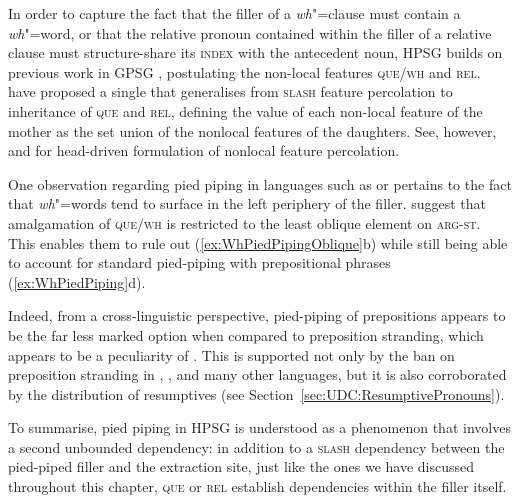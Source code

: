\documentclass[output=paper
,notxmath 
	        ,collection
	        ,collectionchapter
 	        ,biblatex
                ,babelshorthands
                ,newtxmath
                ,draftmode
                ,colorlinks, citecolor=brown
]{langscibook}
\begin{document}
\noindent
In order to capture the fact that the filler of a \emph{wh}"=clause
must contain a \emph{wh}"=word, or that the relative pronoun contained
within the filler of a relative clause must structure-share its
\textsc{index} with the antecedent noun, HPSG builds on previous work
in GPSG \citep{Gazdar85}\addpages, postulating the non-local features
\textsc{que}/\textsc{wh} and \textsc{rel}. \citet[]{Pollard:Sag:94} have proposed
a single  that generalises from
\textsc{slash} feature percolation to inheritance of \textsc{que} and
\textsc{rel}, defining the value of each non-local feature of the
mother as the set union of the nonlocal features of the
daughters. See, however, \citet[Section~4.2]{Sag:97} and \citet{Ginzburg:Sag:01}\addpages
for head-driven formulation of nonlocal feature percolation.

One observation regarding pied piping in languages such as  or
 pertains to the fact that \emph{wh}"=words tend to surface in
the left periphery of the filler. \citet[194,~fn.~26]{Ginzburg:Sag:01} suggest that
amalgamation of \textsc{que/wh} is restricted to the least oblique
element on \textsc{arg-st}. This enables them to rule out
(\ref{ex:WhPiedPipingOblique}b) while still being able to account for
standard pied-piping with prepositional phrases
(\ref{ex:WhPiedPiping}d).

\begin{exe}
  \ex \label{ex:WhPiedPipingOblique}
  \begin{xlist}
  \end{xlist}
\end{exe}

\noindent
Indeed, from a cross-linguistic perspective, pied-piping of
prepositions appears to be the far less marked option when compared to
preposition stranding, which appears to be a peculiarity of
. This is supported not only by the ban on preposition
stranding in , , and many other languages, but it is also
corroborated by the distribution of resumptives (see Section~\ref{sec:UDC:ResumptivePronouns}).

To summarise, pied piping in HPSG is understood as a phenomenon that
involves a second unbounded dependency: in addition to a
\textsc{slash} dependency between the pied-piped filler and the
extraction site, just like the ones we have discussed throughout this
chapter, \textsc{que} or \textsc{rel} establish dependencies within
the filler itself.
\end{document}
